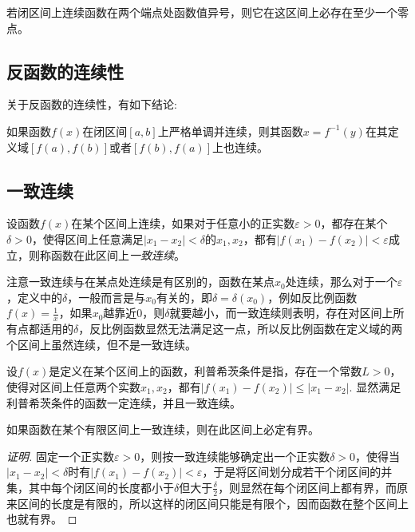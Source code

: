 \begin{inference}[零点定理]
  若闭区间上连续函数在两个端点处函数值异号，则它在这区间上必存在至少一个零点。
\end{inference}

\subsection{反函数的连续性}
\label{sec:continuousness-of-reverse-function}

关于反函数的连续性，有如下结论:
\begin{theorem}
  如果函数$f(x)$在闭区间$[a,b]$上严格单调并连续，则其函数$x=f^{-1}(y)$在其定义域$[f(a),f(b)]$或者$[f(b),f(a)]$上也连续。
\end{theorem}

\subsection{一致连续}
\label{sec:uniform-continuity}

\begin{definition}
  设函数$f(x)$在某个区间上连续，如果对于任意小的正实数$\varepsilon>0$，都存在某个$\delta>0$，使得区间上任意满足$|x_1-x_2|<\delta$的$x_1,x_2$，都有$|f(x_1)-f(x_2)|<\varepsilon$成立，则称函数在此区间上\emph{一致连续}。
\end{definition}

注意一致连续与在某点处连续是有区别的，函数在某点$x_0$处连续，那么对于一个$\varepsilon$，定义中的$\delta$，一般而言是与$x_0$有关的，即$\delta=\delta(x_0)$，例如反比例函数$f(x)=\frac{1}{x}$，如果$x_0$越靠近0，则$\delta$就要越小，而一致连续则表明，存在对区间上所有点都适用的$\delta$，反比例函数显然无法满足这一点，所以反比例函数在定义域的两个区间上虽然连续，但不是一致连续。

\begin{example}[利普希茨连续]
  设$f(x)$是定义在某个区间上的函数，利普希茨条件是指，存在一个常数$L>0$，使得对区间上任意两个实数$x_1,x_2$，都有$|f(x_1)-f(x_2)| \leqslant |x_1-x_2|$. 显然满足利普希茨条件的函数一定连续，并且一致连续。
\end{example}

\begin{theorem}
  如果函数在某个有限区间上一致连续，则在此区间上必定有界。
\end{theorem}

\begin{proof}[证明]
  固定一个正实数$\varepsilon>0$，则按一致连续能够确定出一个正实数$\delta>0$，使得当$|x_1-x_2|<\delta$时有$|f(x_1)-f(x_2)|<\varepsilon$，于是将区间划分成若干个闭区间的并集，其中每个闭区间的长度都小于$\delta$但大于$\frac{\delta}{2}$，则显然在每个闭区间上都有界，而原来区间的长度是有限的，所以这样的闭区间只能是有限个，因而函数在整个区间上也就有界。
\end{proof}

